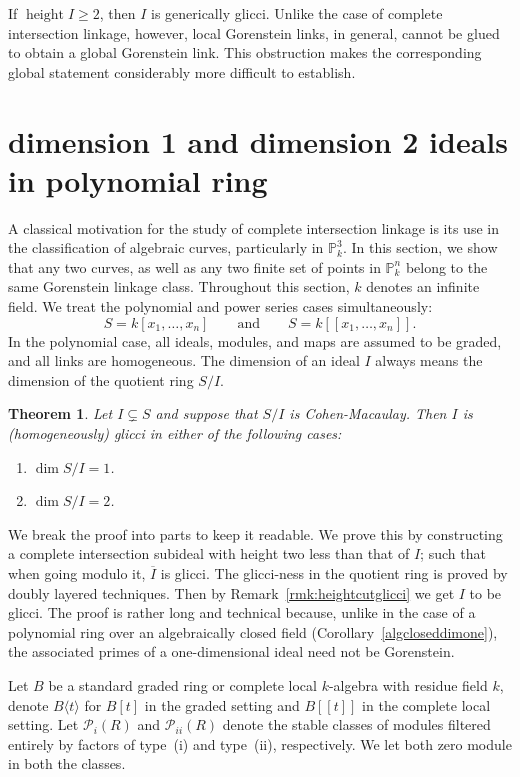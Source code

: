 \documentclass[11pt,letterpaper]{amsart}
\newcommand{\PiC}{\mathcal P_{i}}
\newcommand{\PiiC}{\mathcal P_{ii}}
\DeclareMathOperator{\height}{height}
\theoremstyle{plain}
\newtheorem{thm}{Theorem}[section]
\theoremstyle{definition}
\theoremstyle{remark}
\begin{document}
If $\height I\geq 2$, then $I$ is generically glicci. Unlike
the case of complete intersection linkage, however, local Gorenstein
links, in general, cannot be glued to obtain a global Gorenstein link.
This obstruction makes the corresponding global statement considerably
more difficult to establish.

\section{dimension 1 and dimension 2 ideals in polynomial ring}

A classical motivation for the study of complete intersection linkage
is its use in the classification of algebraic curves, particularly in $\mathbb P^3_k$. In this section, we show that any two curves, as well as any two finite set of points in $\mathbb P_k^n$ belong to the same
Gorenstein linkage class. Throughout this section, $k$ denotes an
infinite field. We treat the polynomial
and power series cases simultaneously:
\[
S=k[x_1,\ldots,x_n]
\qquad\text{and}\qquad
S=k[[x_1,\ldots,x_n]].
\]
In the polynomial case, all ideals, modules, and maps are assumed to
be graded, and all links are homogeneous. The dimension of an ideal
$I$ always means the dimension of the quotient ring $S/I$.

\begin{thm}\label{mainsection9}
Let $I\subsetneq S$ and suppose that $S/I$ is Cohen-Macaulay.
Then $I$ is (homogeneously) glicci in either of the following cases:
\begin{enumerate}
\item[$(a)$] $\dim S/I=1$.
\item[$(b)$] $\dim S/I=2$. %
\end{enumerate}
\end{thm}

We break the proof into parts to keep it readable. We prove this by constructing a complete intersection subideal with height two less than that of $I$; such that when going modulo it, $\overline{I}$ is glicci. The glicci-ness in the quotient ring is proved by doubly layered techniques. Then by
Remark~\ref{rmk:heightcutglicci} we get $I$ to be glicci. The proof is rather long and technical because, unlike in the case of a polynomial ring over an algebraically closed field (Corollary~\ref{algcloseddimone}), the associated primes of a one-dimensional ideal need not be Gorenstein.

Let $B$ be a standard graded ring or complete local $k$-algebra with residue field $k$, denote $B\langle t\rangle$ for $B[t]$ in the graded setting and $B[[t]]$ in the complete local setting. Let $\PiC(R)$ and $\PiiC(R)$ denote the stable classes of modules filtered
entirely by factors of type~(i) and type~(ii), respectively. We let both zero module in both the classes. 
\end{document}

